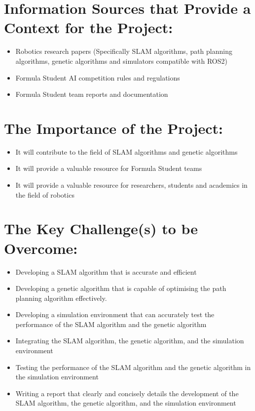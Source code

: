 \documentclass[11pt]{article}
\begin{document}
    \section*{Information Sources that Provide a Context for the Project:}
    \begin{itemize}
        \item Robotics research papers (Specifically SLAM algorithms, path planning algorithms, genetic algorithms and simulators compatible with ROS2)\cite{LeLargeBiederLauer2021, HarperEvolutionary, platt2022comparative}
        \item Formula Student AI competition rules and regulations\cite{FSUKAIRules2025}
        \item Formula Student team reports and documentation
    \end{itemize}

    \section*{The Importance of the Project:}
    \begin{itemize}
        \item It will contribute to the field of SLAM algorithms and genetic algorithms
        \item It will provide a valuable resource for Formula Student teams
        \item It will provide a valuable resource for researchers, students and academics in the field of robotics
    \end{itemize}

    \section*{The Key Challenge(s) to be Overcome:}
    \begin{itemize}
        \item Developing a SLAM algorithm that is accurate and efficient
        \item Developing a genetic algorithm that is capable of optimising the path planning algorithm effectively.
        \item Developing a simulation environment that can accurately test the performance of the SLAM algorithm and the genetic algorithm
        \item Integrating the SLAM algorithm, the genetic algorithm, and the simulation environment
        \item Testing the performance of the SLAM algorithm and the genetic algorithm in the simulation environment
        \item Writing a report that clearly and concisely details the development of the SLAM algorithm, the genetic algorithm, and the simulation environment
    \end{itemize}

    
    
\end{document}
